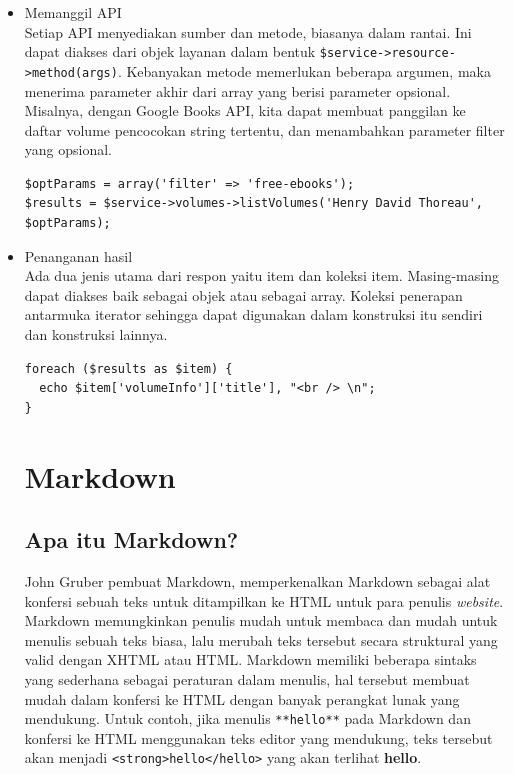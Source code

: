 \begin{itemize}
\begin{itemize}
\item Memanggil API\\
Setiap API menyediakan sumber dan metode, biasanya dalam rantai. Ini dapat diakses dari objek layanan dalam bentuk \verb+$service->resource->method(args)+. Kebanyakan metode memerlukan beberapa argumen, maka menerima parameter akhir dari array yang berisi parameter opsional. Misalnya, dengan Google Books API, kita dapat membuat panggilan ke daftar volume pencocokan string tertentu, dan menambahkan parameter filter yang opsional.
\begin{verbatim}
$optParams = array('filter' => 'free-ebooks');
$results = $service->volumes->listVolumes('Henry David Thoreau', $optParams);
\end{verbatim}

\item Penanganan hasil\\
Ada dua jenis utama dari respon yaitu item dan koleksi item. Masing-masing dapat diakses baik sebagai objek atau sebagai array. Koleksi penerapan antarmuka iterator sehingga dapat digunakan dalam konstruksi itu sendiri dan konstruksi lainnya.
\begin{verbatim}
foreach ($results as $item) {
  echo $item['volumeInfo']['title'], "<br /> \n";
}
\end{verbatim}

\section{Markdown}
\label{sec:markdown}

\subsection{Apa itu Markdown? \cite{Markguide:2015}}
John Gruber pembuat Markdown, memperkenalkan Markdown sebagai alat konfersi
sebuah teks untuk ditampilkan ke HTML untuk para penulis {\it website}. Markdown
memungkinkan penulis mudah untuk membaca dan mudah untuk menulis sebuah teks
biasa, lalu merubah teks tersebut secara struktural yang valid dengan XHTML atau
HTML.
Markdown memiliki beberapa sintaks yang sederhana sebagai peraturan dalam
menulis, hal tersebut membuat mudah dalam konfersi ke HTML dengan banyak
perangkat lunak yang mendukung. Untuk contoh, jika menulis \verb+**hello**+ pada
Markdown dan konfersi ke HTML menggunakan teks editor yang mendukung, teks
tersebut akan menjadi \verb+<strong>hello</hello>+ yang akan terlihat \textbf{hello}.


\end{itemize}
\end{itemize}
